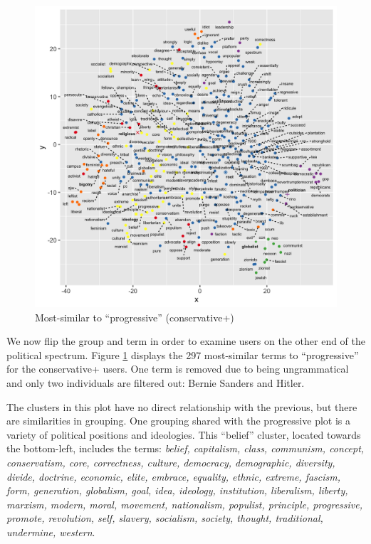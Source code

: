 \documentclass[doublespacing]{utdthesis}
\begin{document}
\begin{figure}[!ht]
\centering
\includegraphics[width=\textwidth]{2016/cons_plus_progressive}
\caption{Most-similar to ``progressive'' (conservative+)}
\label{fig:cons_plus_prog}
\end{figure}

We now flip the group and term in order to examine users on the other end of the political spectrum.
Figure \ref{fig:cons_plus_prog} displays the 297 most-similar terms to ``progressive'' for the conservative+ users.
One term is removed due to being ungrammatical and only two individuals are filtered out: Bernie Sanders and Hitler.

The clusters in this plot have no direct relationship with the previous, but there are similarities in grouping.
One grouping shared with the progressive plot is a variety of political positions and ideologies.
This ``belief'' cluster, located towards the bottom-left, includes the terms: \emph{belief, capitalism, class, communism, concept, conservatism, core, correctness, culture, democracy, demographic, diversity, divide, doctrine, economic, elite, embrace, equality, ethnic, extreme, fascism, form, generation, globalism, goal, idea, ideology, institution, liberalism, liberty, marxism, modern, moral, movement, nationalism, populist, principle, progressive, promote, revolution, self, slavery, socialism, society, thought, traditional, undermine, western}.
\end{document}
